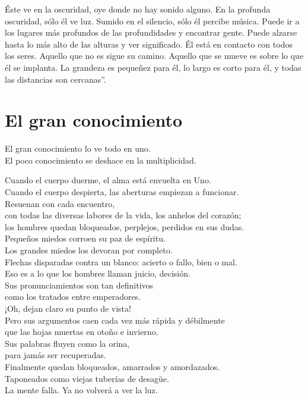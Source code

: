 \documentclass[hidelinks]{memoir}
\begin{document}
	Éste ve en la oscuridad, oye donde no hay sonido alguno. En la profunda
	oscuridad, sólo él ve luz. Sumido en el silencio, sólo él percibe
	música. Puede ir a los lugares más profundos de las profundidades y
	encontrar gente. Puede alzarse hasta lo más alto de las alturas y ver
	significado. Él está en contacto con todos los seres. Aquello que no es
	sigue su camino. Aquello que se mueve es sobre lo que él se implanta. La
	grandeza es pequeñez para él, lo largo es corto para él, y todas las
	distancias son cercanas''.
	
	\chapter*{El gran conocimiento}
	
	El gran conocimiento lo ve todo en uno.\\
	El poco conocimiento se deshace en la multiplicidad.
	
	Cuando el cuerpo duerme, el alma está envuelta en Uno.\\
	Cuando el cuerpo despierta, las aberturas empiezan a funcionar.\\
	Resuenan con cada encuentro,\\
	con todas las diversas labores de la vida, los anhelos del corazón;\\
	los hombres quedan bloqueados, perplejos, perdidos en sus dudas.\\
	Pequeños miedos corroen su paz de espíritu.\\
	Los grandes miedos los devoran por completo.\\
	Flechas disparadas contra un blanco: acierto o fallo, bien o mal.\\
	Eso es a lo que los hombres llaman juicio, decisión.\\
	Sus pronunciamientos son tan definitivos\\
	como los tratados entre emperadores.\\
	¡Oh, dejan claro su punto de vista!\\
	Pero sus argumentos caen cada vez más rápida y débilmente\\
	que las hojas muertas en otoño e invierno.\\
	Sus palabras fluyen como la orina,\\
	para jamás ser recuperadas.\\
	Finalmente quedan bloqueados, amarrados y amordazados.\\
	Taponeados como viejas tuberías de desagüe.\\
	La mente falla. Ya no volverá a ver la luz.
	
\end{document}
